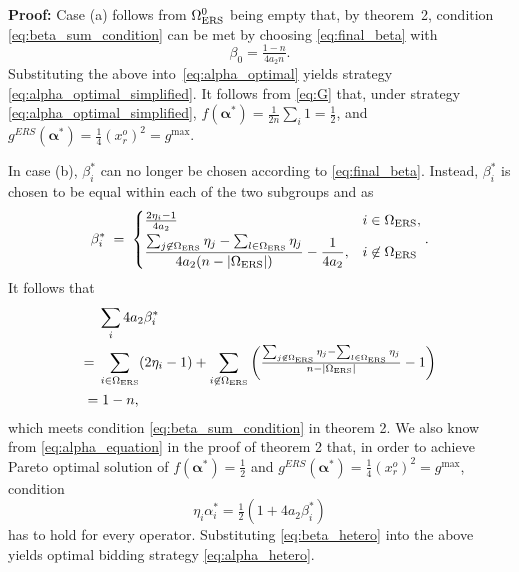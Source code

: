 \documentclass[conference]{IEEEtran}
\begin{document}
\noindent\textbf{Proof:} Case (a) follows from $\Omega_{\rm ERS}^0$ being empty that, by theorem~2, condition \eqref{eq:beta_sum_condition} can be met by choosing \eqref{eq:final_beta} with   
\begin{equation}
\beta_0= \tfrac{1-n}{4a_2n}.  \label{eq:beta_optimal_simplified}
\end{equation}
Substituting the above into~\eqref{eq:alpha_optimal} yields strategy \eqref{eq:alpha_optimal_simplified}. It follows from \eqref{eq:G} that, under strategy \eqref{eq:alpha_optimal_simplified},
$f(\boldsymbol{\alpha}^*)=\tfrac{1}{2n}\sum_i 1=\tfrac{1}{2}$, and
$g^{ERS}(\boldsymbol{\alpha}^*)=\frac{1}{4}(x_r^o)^2=g^{\max}$.

In case (b), $\beta_i^*$ can no longer be chosen according to \eqref{eq:final_beta}. Instead, $\beta_i^*$ is chosen to be equal within each of the two subgroups and as 
\begin{equation}
    \beta_i^* \;=\; \begin{cases}
        \frac{2\eta_i-1}{4a_2} & i\in\Omega_{\rm ERS}, \\[3pt]
        \displaystyle\frac{\sum_{j\not\in\Omega_{\rm ERS}}\eta_j-\sum_{l\in\Omega_{\rm ERS}}\eta_j}{4a_2(n-|\Omega_{\rm ERS}|)}-\frac{1}{4a_2}, & i\not\in\Omega_{\rm ERS}
    \end{cases}.
    \label{eq:beta_hetero}
\end{equation}
It follows that 
\[
\begin{aligned}
    & \sum_i 4a_2\beta_i^* \\
    =\; & \sum_{i\in\Omega_{\rm ERS}}(2\eta_i-1)  + \sum_{i\not\in\Omega_{\rm ERS}} \left(\tfrac{\sum_{j\not\in\Omega_{\rm ERS}}\eta_j-\sum_{l\in\Omega_{\rm ERS}}\eta_j}{n-|\Omega_{\rm ERS}|}-1\right) \\
    = & \; 1 - n,
\end{aligned}
\]
which meets condition \eqref{eq:beta_sum_condition} in theorem 2. We also know from \eqref{eq:alpha_equation} in the proof of theorem 2 that, in order to achieve Pareto optimal solution of 
$f(\boldsymbol{\alpha}^*)=\tfrac{1}{2}$ and
$g^{ERS}(\boldsymbol{\alpha}^*)=\frac{1}{4}(x_r^o)^2=g^{\max}$, condition 
\[ \eta_i\alpha_i^*=\tfrac12(1+4a_2\beta_i^*) \] 
has to hold for every operator. Substituting \eqref{eq:beta_hetero} into the above yields optimal bidding strategy \eqref{eq:alpha_hetero}.
\end{document}
